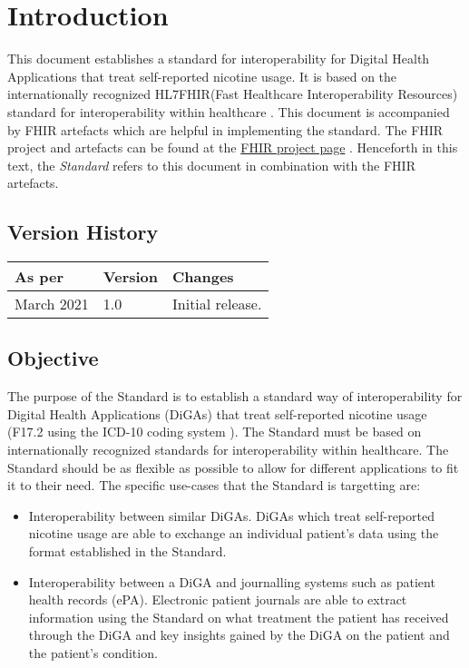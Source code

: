 \documentclass[12px]{report}
\newcommand{\fhir}{FHIR\textsuperscript{\textregistered}}
\newcommand{\hl}{HL7\textsuperscript{\textregistered}}
\begin{document}
\tableofcontents

\chapter{Introduction}
\label{ch:intro}

This document establishes a standard for interoperability for Digital Health Applications that treat self-reported nicotine usage. It is based on the internationally recognized \hl \fhir (Fast Healthcare Interoperability Resources) standard for interoperability 
within healthcare \cite{FHIR}. This document is accompanied by FHIR artefacts which are helpful in implementing the standard. The FHIR project and artefacts can be found at the \href{https://simplifier.net/treat-nicotine-usage-diga}{FHIR project page} \cite{project}.
Henceforth in this text, the \textit{Standard} refers to this document in combination with the FHIR artefacts.

\section{Version History}
\begin{table}[H]
    \begin{tabular}{@{}lll@{}}
    \textbf{As per}                 & \textbf{Version}         & \textbf{Changes} \\ \midrule
    \multicolumn{1}{l|}{March 2021} & \multicolumn{1}{l|}{1.0} & Initial release. \\ \bottomrule
    \end{tabular}
    \label{tab:version}
    \end{table}

\section{Objective}
The purpose of the Standard is to establish a standard way of interoperability for Digital Health Applications (DiGAs) that treat self-reported nicotine usage (F17.2 using the ICD-10 coding system \cite{dimdi}). The Standard must be based on internationally recognized
standards for interoperability within healthcare. The Standard should be as flexible as possible to allow for different applications to fit it to their need. The specific use-cases that the Standard is targetting are:

\begin{itemize}
    \item Interoperability between similar DiGAs. DiGAs which treat self-reported nicotine usage are able to exchange an individual patient's data using the format established in the Standard.
    \item Interoperability between a DiGA and journalling systems such as patient health records (ePA). Electronic patient journals are able to extract information using the Standard on what treatment the patient has received through the DiGA and key insights gained by the DiGA on the patient and the patient's condition.
\end{itemize}
\end{document}

